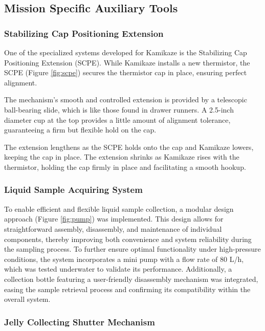 \subsection{Mission Specific Auxiliary Tools}

\subsubsection{Stabilizing Cap Positioning Extension}

One of the specialized systems developed for Kamikaze is the Stabilizing Cap Positioning Extension (SCPE). While Kamikaze installs a new thermistor, the SCPE (Figure \ref{fig:scpe}) secures the thermistor cap in place, ensuring perfect alignment.

\hspace{10pt} The mechanism's smooth and controlled extension is provided by a telescopic ball-bearing slide, which is like those found in drawer runners. A 2.5-inch diameter cup at the top provides a little amount of alignment tolerance, guaranteeing a firm but flexible hold on the cap.

\hspace{10pt} The extension lengthens as the SCPE holds onto the cap and Kamikaze lowers, keeping the cap in place. The extension shrinks as Kamikaze rises with the thermistor, holding the cap firmly in place and facilitating a smooth hookup.

\subsubsection{Liquid Sample Acquiring System}

To enable efficient and flexible liquid sample collection, a modular design approach (Figure \ref{fig:pump}) was implemented. This design allows for straightforward assembly, disassembly, and maintenance of individual components, thereby improving both convenience and system reliability during the sampling process. To further ensure optimal functionality under high-pressure conditions, the system incorporates a mini pump with a flow rate of 80 L/h, which was tested underwater to validate its performance. Additionally, a collection bottle featuring a user-friendly disassembly mechanism was integrated, easing the sample retrieval process and confirming its compatibility within the overall system.

\subsubsection{Jelly Collecting Shutter Mechanism}

